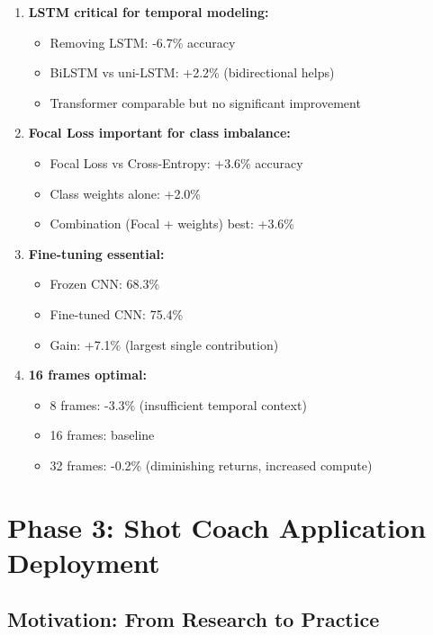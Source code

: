 \documentclass[11pt,a4paper]{article}
\begin{document}
\begin{enumerate}
\item \textbf{LSTM critical for temporal modeling:}
   \begin{itemize}
   \item Removing LSTM: -6.7\% accuracy
   \item BiLSTM vs uni-LSTM: +2.2\% (bidirectional helps)
   \item Transformer comparable but no significant improvement
   \end{itemize}

\item \textbf{Focal Loss important for class imbalance:}
   \begin{itemize}
   \item Focal Loss vs Cross-Entropy: +3.6\% accuracy
   \item Class weights alone: +2.0\%
   \item Combination (Focal + weights) best: +3.6\%
   \end{itemize}

\item \textbf{Fine-tuning essential:}
   \begin{itemize}
   \item Frozen CNN: 68.3\%
   \item Fine-tuned CNN: 75.4\%
   \item Gain: +7.1\% (largest single contribution)
   \end{itemize}

\item \textbf{16 frames optimal:}
   \begin{itemize}
   \item 8 frames: -3.3\% (insufficient temporal context)
   \item 16 frames: baseline
   \item 32 frames: -0.2\% (diminishing returns, increased compute)
   \end{itemize}
\end{enumerate}

\section{Phase 3: Shot Coach Application Deployment}

\subsection{Motivation: From Research to Practice}
\end{document}
